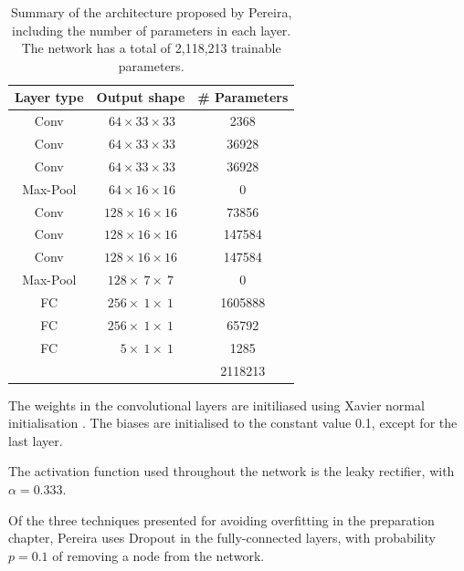\documentclass[12pt,a4paper,twoside,openright]{report}
\begin{document}
\begin{table}
\centering	
\label{table:pereira_weights}
\begin{tabular}{ c c S[table-format=7.0] } 
\textbf{Layer type} & \textbf{Output shape} & \textbf{\# Parameters} \\
 \hline
 Conv 		& $\ 64 	\times 33 	\times 33$ 	& 2368 \\ 
 Conv 		& $\ 64 	\times 33 	\times 33$ 	& 36928 \\ 
 Conv 		& $\ 64 	\times 33 	\times 33$	& 36928 \\ 
Max-Pool 	& $\ 64 	\times 16 	\times 16$ 	& 0\\
 Conv 		& $128 		 \times 16 	\times 16$	& 73856 \\ 
 Conv 		& $128 		\times 16 	\times 16$ 	& 147584 \\ 
 Conv 		& $128 		\times 16 	\times 16$ 	& 147584 \\ 
Max-Pool 	& $128 		\times\ 7 	\times\ 7$	& 0\\
FC			& $256 		\times\ 1 	\times\ 1$	& 1605888\\
FC			& $256 		\times\ 1 	\times\ 1$	& 65792\\
FC			& $\quad 5 	\times\ 1 	\times\ 1$ 	& 1285\\
\hhline{~~=}
\rule{0pt}{3ex}    
&& 2118213\\
\end{tabular}
\caption[Summary of the architecture proposed by Pereira, including the number of parameters in each layer.]{Summary of the architecture proposed by Pereira, including the number of parameters in each layer. The network has a total of 2,118,213 trainable parameters.}
\end{table}


The weights in the convolutional layers are initiliased using Xavier normal initialisation \cite{xavier_init}. The biases are initialised to the constant value 0.1, except for the last layer.

The activation function used throughout the network is the leaky rectifier, with  $\alpha = 0.333$.

Of the three techniques presented for avoiding overfitting in the preparation chapter, Pereira uses Dropout \cite{dropout} in the fully-connected layers, with probability $p=0.1$ of removing a node from the network.
\end{document}
